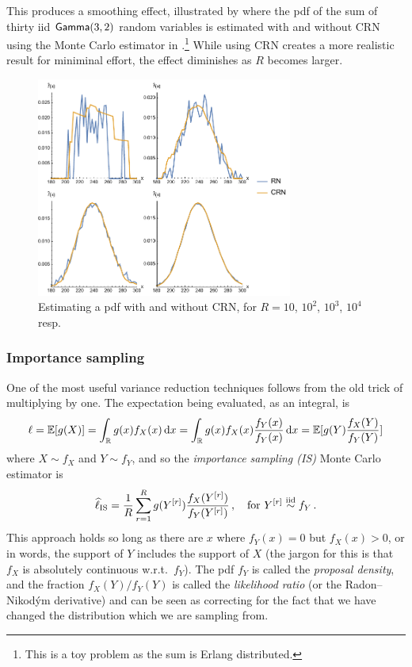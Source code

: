 This produces a smoothing effect, illustrated by  where the pdf of the sum of thirty iid $\mathsf{Gamma}(3,2)$ random variables is estimated with and without CRN using the Monte Carlo estimator in \cite{Pushout}.\footnote{This is a toy problem as the sum is Erlang distributed.} While using CRN creates a more realistic result for miniminal effort, the effect diminishes as $R$ becomes larger.

\begin{figure}[H]
\centering
\includegraphics[width=0.75\textwidth]{images/crn.pdf}
\caption{Estimating a pdf with and without CRN, for $R = 10$, $10^2$, $10^3$, $10^4$ resp.}
\label{fig:crn}
\end{figure}

\subsubsection{Importance sampling}

One of the most useful variance reduction techniques follows from the old trick of multiplying by one. The expectation being evaluated, as an integral, is
\[ \ell = \operatorname{{\mathbb E}}[ g(X) ] = \int_{\mathbb{R}} g(x) f_X(x) \mathop{}\!\mathrm{d} x = \int_{\mathbb{R}} g(x) f_X(x) \frac{f_Y(x)}{f_Y(x)} \mathop{}\!\mathrm{d} x = \operatorname{{\mathbb E}}[ g(Y) \frac{f_X(Y)}{f_Y(Y)} ] \]
where $X \sim f_X$ and $Y \sim f_Y$, and so the \emph{importance sampling (IS)} Monte Carlo estimator is
\[ \widehat{\ell}_{\mathrm{IS}} = \frac1R \sum_{r=1}^R g(Y^{[r]}) \frac{f_X(Y^{[r]})}{f_Y(Y^{[r]})} \,, \quad \text{for } Y^{[r]} \overset{\smash{\mathrm{iid}}}{\sim} f_Y \,. \]
This approach holds so long as there are $x$ where $f_Y(x)=0$ but $f_X(x) > 0$, or in words, the support of $Y$ includes the support of $X$ (the jargon for this is that $f_X$ is absolutely continuous w.r.t.\ $f_Y$). The pdf $f_Y$ is called the \emph{proposal density}, and the fraction $f_X(Y) / f_Y(Y)$ is called the \emph{likelihood ratio} (or the Radon--Nikod{\'y}m derivative) and can be seen as correcting for the fact that we have changed the distribution which we are sampling from.

